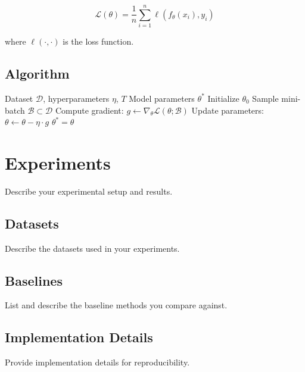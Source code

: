 \documentclass{article}
\begin{document}
\begin{equation}
    \mathcal{L}(\theta) = \frac{1}{n} \sum_{i=1}^{n} \ell(f_\theta(x_i), y_i)
    \label{eq:loss}
\end{equation}

where $\ell(\cdot, \cdot)$ is the loss function.

\subsection{Algorithm}

\begin{algorithm}[tb]
   \caption{Algorithm Name}
   \label{alg:main}
\begin{algorithmic}
    Dataset $\mathcal{D}$, hyperparameters $\eta$, $T$
    Model parameters $\theta^*$
   \STATE Initialize $\theta_0$
      \STATE Sample mini-batch $\mathcal{B} \subset \mathcal{D}$
      \STATE Compute gradient: $g \leftarrow \nabla_\theta \mathcal{L}(\theta; \mathcal{B})$
      \STATE Update parameters: $\theta \leftarrow \theta - \eta \cdot g$
   \ENDFOR
   \RETURN $\theta^* = \theta$
\end{algorithmic}
\end{algorithm}

\section{Experiments}
\label{sec:experiments}

Describe your experimental setup and results.

\subsection{Datasets}

Describe the datasets used in your experiments.

\subsection{Baselines}

List and describe the baseline methods you compare against.

\subsection{Implementation Details}

Provide implementation details for reproducibility.
\end{document}
